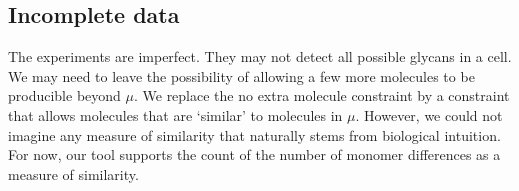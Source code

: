 \documentclass{llncs}
\begin{document}
\subsection{Incomplete data}

The experiments are imperfect. They may not detect all possible glycans
in a cell.
We may need to leave the possibility of allowing a few more molecules to be
producible beyond $\mu$.
We replace the no extra molecule constraint by a constraint that allows molecules
that are `similar' to molecules in $\mu$.
However, we could not imagine any measure of similarity that naturally stems from
biological intuition.
For now, our tool supports the count of the number of monomer differences
as a measure of similarity.




% 
\end{document}
